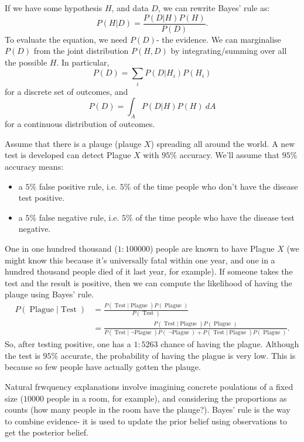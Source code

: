 \documentclass[a4paper, openany]{memoir}
\begin{document}
If we have some hypothesis $H$, and data $D$, we can rewrite Bayes' rule as:
\[P(H|D) = \frac{P(D|H)P(H)}{P(D)}.\]
To evaluate the equation, we need $P(D)$- the evidence. We can marginalise $P(D)$ from the joint distribution $P(H, D)$ by integrating/summing over all the possible $H$. In particular,
\[P(D) = \sum_i P(D|H_i) P(H_i)\]
for a discrete set of outcomes, and
\[P(D) = \int_A P(D|H) P(H) \ dA\]
for a continuous distribution of outcomes.

Assume that there is a plauge (plauge $X$) spreading all around the world. A new test is developed can detect Plague $X$ with $95\%$ accuracy. We'll assume that $95\%$ accuracy means:
\begin{itemize}
    \item a $5\%$ false positive rule, i.e. $5\%$ of the time people who don't have the disease test positive.
    \item a $5\%$ false negative rule, i.e. $5\%$ of the time people who have the disease test negative.
\end{itemize}
One in one hundred thousand ($1:100 000$) people are known to have Plague $X$ (we might know this because it's universally fatal within one year, and one in a hundred thousand people died of it last year, for example). If someone takes the test and the result is positive, then we can compute the likelihood of having the plauge using Bayes' rule.
\small{\begin{align*}
    P(\operatorname{Plague}|\operatorname{Test}) &= \frac{P(\operatorname{Test}|\operatorname{Plague}) P(\operatorname{Plague})}{ P(\operatorname{Test})} \\
    &= \frac{P(\operatorname{Test}|\operatorname{Plague}) P(\operatorname{Plague})}{P(\operatorname{Test}|\operatorname{\lnot Plague})P(\operatorname{\lnot Plague}) + P(\operatorname{Test}|\operatorname{Plague})P(\operatorname{Plague})}.
\end{align*}}
So, after testing positive, one has a $1:5263$ chance of having the plague. Although the test is $95\%$ accurate, the probability of having the plague is very low. This is because so few people have actually gotten the plauge.

Natural frwquency explanations involve imagining concrete poulations of a fixed size ($10 000$ people in a room, for example), and considering the proportions as counts (how many people in the room have the plauge?). Bayes' rule is the way to combine evidence- it is used to update the prior belief using observations to get the posterior belief.
\end{document}
